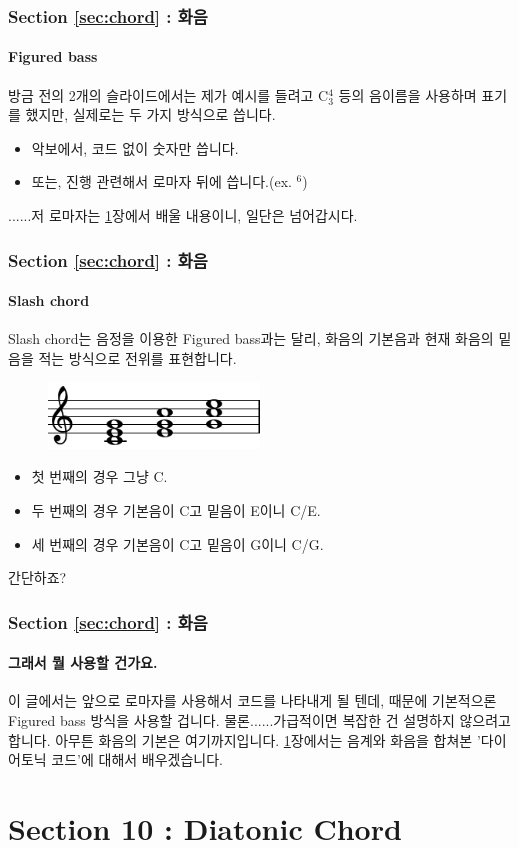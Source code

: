 \documentclass{beamer}
\newcommand{\Rn}[1]{%
	\textup{\uppercase\expandafter{\romannumeral#1}}%
}
\begin{document}
	\begin{frame}
		\frametitle{Section \ref{sec:chord} : 화음}
		\framesubtitle{Figured bass}
		방금 전의 2개의 슬라이드에서는 제가 예시를 들려고 C$^4_3$ 등의 음이름을 사용하며 표기를 했지만, 실제로는 두 가지 방식으로 씁니다.
		\begin{itemize}
			\item 악보에서, 코드 없이 숫자만 씁니다.
			\item 또는, 진행 관련해서 로마자 뒤에 씁니다.(ex. \Rn{4}$^6$)
		\end{itemize}
		......저 로마자는 \ref{sec:diatonic_chord}장에서 배울 내용이니, 일단은 넘어갑시다.
	\end{frame}
	
	\begin{frame}
		\frametitle{Section \ref{sec:chord} : 화음}
		\framesubtitle{Slash chord}
		Slash chord는 음정을 이용한 Figured bass과는 달리, 화음의 기본음과 현재 화음의 밑음을 적는 방식으로 전위를 표현합니다.
		\begin{figure}
			\centering
			\includegraphics[width=0.5\textwidth]{res/pdf/9/inversion/triad.pdf}
		\end{figure}
		\vskip -1pc
		\begin{itemize}
			\item 첫 번째의 경우 그냥 C.
			\item 두 번째의 경우 기본음이 C고 밑음이 E이니 C/E.
			\item 세 번째의 경우 기본음이 C고 밑음이 G이니 C/G.
		\end{itemize}
		간단하죠?
	\end{frame}
	
	\begin{frame}
		\frametitle{Section \ref{sec:chord} : 화음}
		\framesubtitle{그래서 뭘 사용할 건가요.}
		이 글에서는 앞으로 로마자를 사용해서 코드를 나타내게 될 텐데, 때문에 기본적으론 Figured bass 방식을 사용할 겁니다. 물론......가급적이면 복잡한 건 설명하지 않으려고 합니다. 아무튼 화음의 기본은 여기까지입니다. \ref{sec:diatonic_chord}장에서는 음계와 화음을 합쳐본 '다이어토닉 코드'에 대해서 배우겠습니다.
	\end{frame}
	
	\section{Section 10 : Diatonic Chord}\label{sec:diatonic_chord}
\end{document}
